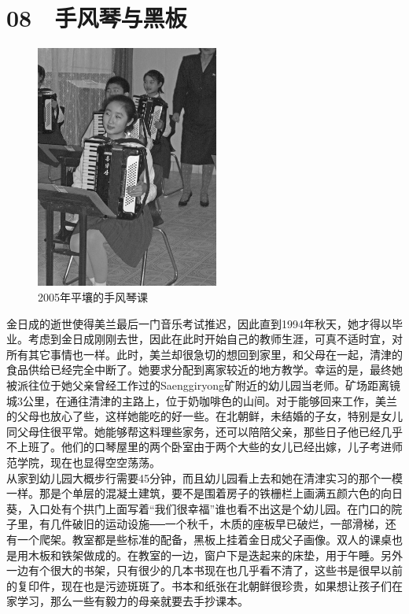\fancyhead[RO]{\thepage}
\fancyhead[LE]{\thepage}
\fancyfoot[LE,RO]{}
\fancyfoot[LO,CE]{}
\fancyfoot[CO,RE]{}
\chapter*{08 {\FA } 手风琴与黑板}
\begin{figure}[!htbp]
	\centering
	\includegraphics[width=6cm]{./Chapters/Images/08.jpg}
	\caption*{2005年平壤的手风琴课}
\end{figure}


金日成的逝世使得美兰最后一门音乐考试推迟，因此直到1994年秋天，她才得以毕业。考虑到金日成刚刚去世，因此在此时开始自己的教师生涯，可真不适时宜，对所有其它事情也一样。此时，美兰却很急切的想回到家里，和父母在一起，清津的食品供给已经完全中断了。她要求分配到离家较近的地方教学。幸运的是，最终她被派往位于她父亲曾经工作过的Saenggiryong矿附近的幼儿园当老师。矿场距离镜城3公里，在通往清津的主路上，位于奶咖啡色的山间。对于能够回来工作，美兰的父母也放心了些，这样她能吃的好一些。在北朝鲜，未结婚的子女，特别是女儿同父母住很平常。她能够帮这料理些家务，还可以陪陪父亲，那些日子他已经几乎不上班了。他们的口琴屋里的两个卧室由于两个大些的女儿已经出嫁，儿子考进师范学院，现在也显得空空荡荡。\\

从家到幼儿园大概步行需要45分钟，而且幼儿园看上去和她在清津实习的那个一模一样。那是个单层的混凝土建筑，要不是围着房子的铁栅栏上画满五颜六色的向日葵，入口处有个拱门上面写着“我们很幸福”谁也看不出这是个幼儿园。在门口的院子里，有几件破旧的运动设施──一个秋千，木质的座板早已破烂，一部滑梯，还有一个爬架。教室都是些标准的配备，黑板上挂着金日成父子画像。双人的课桌也是用木板和铁架做成的。在教室的一边，窗户下是迭起来的床垫，用于午睡。另外一边有个很大的书架，只有很少的几本书现在也几乎看不清了，这些书是很早以前的复印件，现在也是污迹斑斑了。书本和纸张在北朝鲜很珍贵，如果想让孩子们在家学习，那么一些有毅力的母亲就要去手抄课本。\\

